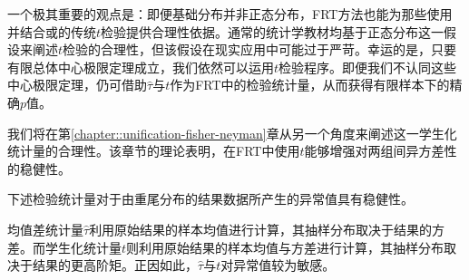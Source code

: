 一个极其重要的观点是：即便基础分布并非正态分布，FRT方法也能为那些使用并结合或的传统$t$检验提供合理性依据。通常的统计学教材均基于正态分布这一假设来阐述$t$检验的合理性，但该假设在现实应用中可能过于严苛。幸运的是，只要有限总体中心极限定理成立，我们依然可以运用$t$检验程序。即便我们不认同这些中心极限定理，仍可借助$\hat{\tau}$与$t$作为FRT中的检验统计量，从而获得有限样本下的精确$p$值。 


我们将在第\ref{chapter::unification-fisher-neyman}章从另一个角度来阐述这一学生化统计量的合理性。该章节的理论表明，在FRT中使用$t$能够增强对两组间异方差性的稳健性。 


下述检验统计量对于由重尾分布的结果数据所产生的异常值具有稳健性。 




\begin{example}[威尔科克森秩和]\label{example::wilcoxon-cre}
均值差统计量$ \hat{\tau} $利用原始结果的样本均值进行计算，其抽样分布取决于结果的方差。而学生化统计量$t$则利用原始结果的样本均值与方差进行计算，其抽样分布取决于结果的更高阶矩。正因如此，$ \hat{\tau} $与$t$对异常值较为敏感。 


\end{example}
